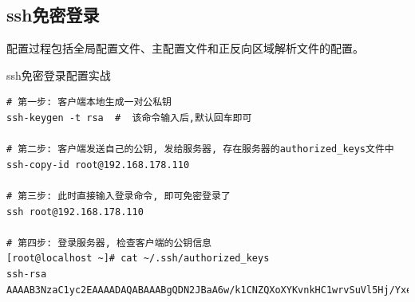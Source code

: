 \subsection{ssh免密登录}
配置过程包括全局配置文件、主配置文件和正反向区域解析文件的配置。
\begin{ascboxB}{ssh免密登录配置实战}
\begin{verbatim}
# 第一步: 客户端本地生成一对公私钥
ssh-keygen -t rsa  #  该命令输入后,默认回车即可

# 第二步: 客户端发送自己的公钥, 发给服务器, 存在服务器的authorized_keys文件中
ssh-copy-id root@192.168.178.110

# 第三步: 此时直接输入登录命令, 即可免密登录了
ssh root@192.168.178.110

# 第四步: 登录服务器, 检查客户端的公钥信息
[root@localhost ~]# cat ~/.ssh/authorized_keys
ssh-rsa AAAAB3NzaC1yc2EAAAADAQABAAABgQDN2JBaA6w/k1CNZQXoXYKvnkHC1wrvSuVl5Hj/YxetQzRXt4yGKa/e9fX4glQvcoJ/SVHX7klXYGrDGBPEMYFjU+hKFLNhieIjXJg8Yc6mUJ9OlUL4E3di25mAFSyu0l2XSDxLw2zgoZ.........
\end{verbatim}
\end{ascboxB}
\btrule{}

